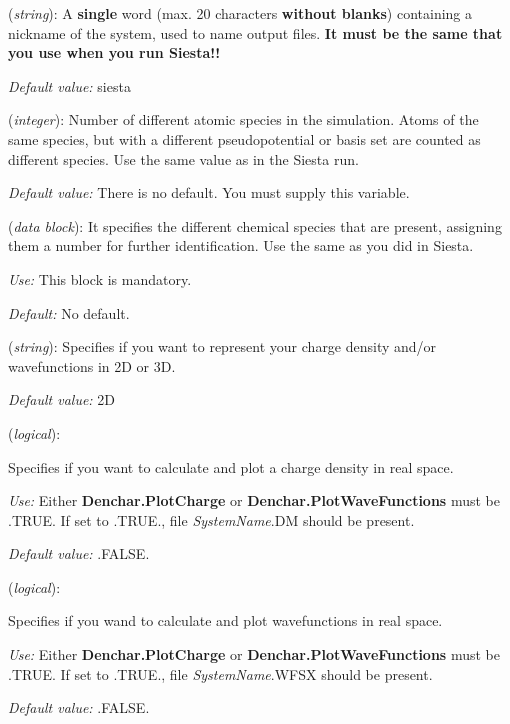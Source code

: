 \begin{description}
\itemsep 10pt
\parsep 0pt

\item[{\bf SystemLabel}] ({\it string}): 
A {\bf single} word (max. 20 characters {\bf without blanks})
containing a nickname of the system, used to name output files. 
{\bf It must be the same that you use when you run {\sc Siesta}!!}

{\it Default value:} siesta

\item[{\bf NumberOfSpecies}] ({\it integer}):
Number of different atomic species in the simulation.
Atoms of the same species, but with a different
pseudopotential or basis set are counted as different species.
Use the same value as in the {\sc Siesta} run.

{\it Default value:} There is no default. You must supply this variable.


\item[{\bf ChemicalSpeciesLabel}] ({\it data block}):
It specifies the different chemical species that are present,
assigning them a number for further identification.
Use the same as you did in {\sc Siesta}.

{\it Use:} This block is mandatory.

{\it Default:} No default.

\item[{\bf Denchar.TypeOfRun}] ({\it string}): 
Specifies if you want to represent your charge density
and/or wavefunctions in 2D or 3D.

{\it Default value:} 2D

\item[{\bf Denchar.PlotCharge}] ({\it logical}): 

Specifies if you want to calculate and plot a charge density
in real space.

{\it Use:} Either {\bf Denchar.PlotCharge} or
{\bf Denchar.PlotWaveFunctions} must be .TRUE.
If set to .TRUE., file {\it SystemName}.DM should
be present.

{\it Default value:} .FALSE.

\item[{\bf Denchar.PlotWaveFunctions}] ({\it logical}): 

Specifies if you wand to calculate and plot wavefunctions
in real space.

{\it Use:} Either {\bf Denchar.PlotCharge} or
{\bf Denchar.PlotWaveFunctions} must be .TRUE.
If set to .TRUE., file {\it SystemName}.WFSX should
be present.

{\it Default value:} .FALSE.
\end{description}



